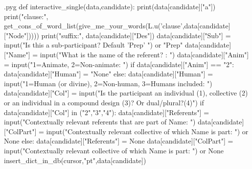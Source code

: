 \documentclass{report}
\makeatletter
\newenvironment{python}{%
  \VerbatimEnvironment
  \minted@resetoptions
  \setkeys{minted@opt}{}
      \begin{VerbatimOut}{\jobname.pyg}}
{%
      \end{VerbatimOut}
      \minted@pygmentize{python}
      \DeleteFile{\jobname.pyg}}
\makeatother
\begin{document}
\begin{python}
def interactive_single(data,candidate):
    print(data[candidate]["a"])
    print("clause:", get_cons_of_word_list(give_me_your_words(L.u('clause',data[candidate]["Node"])))) 
    print("suffix:", data[candidate]["Des"])
    data[candidate]["Sub"] = input("Is this a sub-participant? Default 'Prep' ") or "Prep" 
    data[candidate]["Name"] = input("What is the name of the referent? : ")
    data[candidate]["Anim"] = input("1=Animate, 2=Non-animate: ")
    if data[candidate]["Anim"] == "2":
        data[candidate]["Human"] = "None"
    else:
        data[candidate]["Human"] = input("1=Human (or divine), 2=Non-human, 3=Humans included: ")
    data[candidate]["Col"] = input("Is the participant an individual (1), collective (2) or an individual in a compound design (3)? Or dual/plural?(4)")
    if data[candidate]["Col"] in ("2","3","4"):
        data[candidate]["Referents"] = input("Contextually relevant referents that are part of Name: ")
        data[candidate]["ColPart"] = input("Contextually relevant collective of which Name is part: ") or None
    else:
        data[candidate]["Referents"] = None
        data[candidate]["ColPart"] = input("Contextually relevant collective of which Name is part: ") or None
    insert_dict_in_db(cursor,"pt",data[candidate])

\end{python}
\end{document}
